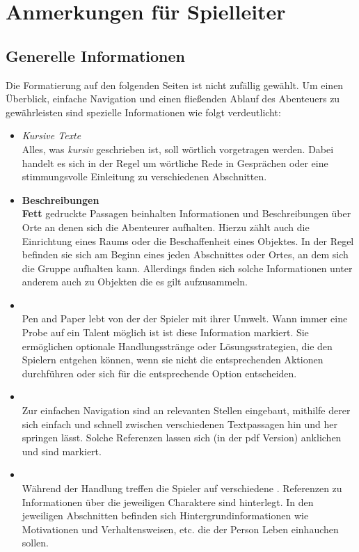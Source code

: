 \chapter*{Anmerkungen für Spielleiter}

\section*{Generelle Informationen}

Die Formatierung auf den folgenden Seiten ist nicht zufällig gewählt. Um einen Überblick, einfache Navigation und
einen fließenden Ablauf des Abenteuers zu gewährleisten sind spezielle Informationen wie folgt verdeutlicht:

\begin{itemize}
  \item \textit{Kursive Texte} \\
  Alles, was \textit{kursiv} geschrieben ist, soll wörtlich vorgetragen werden. Dabei handelt es sich in der Regel
  um wörtliche Rede in Gesprächen oder eine stimmungsvolle Einleitung zu verschiedenen Abschnitten.

  \item \textbf{Beschreibungen} \\
  \textbf{Fett} gedruckte Passagen beinhalten Informationen und Beschreibungen über Orte an denen sich die
  Abenteurer aufhalten. Hierzu zählt auch die Einrichtung eines Raums oder die Beschaffenheit eines Objektes.
  In der Regel befinden sie sich am Beginn eines jeden Abschnittes oder Ortes, an dem sich die Gruppe aufhalten
  kann. Allerdings finden sich solche Informationen unter anderem auch zu Objekten die es gilt aufzusammeln.

  \item {} \\
  Pen and Paper lebt von der  der Spieler mit ihrer Umwelt. Wann immer eine Probe auf ein Talent
  möglich ist ist diese Information  markiert. Sie ermöglichen optionale Handlungsstränge oder
  Lösungsstrategien, die den Spielern entgehen können, wenn sie nicht die entsprechenden Aktionen durchführen oder
  sich für die entsprechende Option entscheiden.

  \item {} \\
  Zur einfachen Navigation sind an relevanten Stellen  eingebaut, mithilfe derer sich einfach und
  schnell zwischen verschiedenen Textpassagen hin und her springen lässt. Solche Referenzen lassen sich (in der pdf
  Version) anklichen und sind  markiert.

  \item {} \\
  Während der Handlung treffen die Spieler auf verschiedene . Referenzen zu Informationen über
  die jeweiligen Charaktere sind  hinterlegt. In den jeweiligen Abschnitten befinden sich
  Hintergrundinformationen wie Motivationen und Verhaltensweisen, etc. die der Person Leben einhauchen sollen.

\end{itemize}
